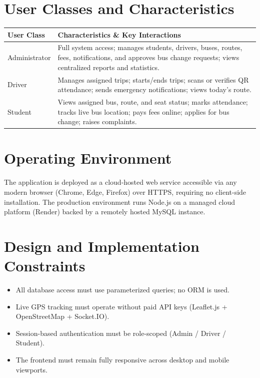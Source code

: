\documentclass[11pt,a4paper]{report}
\begin{document}
\section{User Classes and Characteristics}
\begin{longtable}{@{}p{2.6cm}p{11cm}@{}}
\toprule
\rowcolor{pine!10}\textbf{User Class} & \textbf{Characteristics \& Key Interactions} \\
\midrule
\endhead
Administrator & Full system access; manages students, drivers, buses, routes, fees, notifications, and approves bus change requests; views centralized reports and statistics. \\
Driver & Manages assigned trips; starts/ends trips; scans or verifies QR attendance; sends emergency notifications; views today's route. \\
Student & Views assigned bus, route, and seat status; marks attendance; tracks live bus location; pays fees online; applies for bus change; raises complaints. \\
\bottomrule
\end{longtable}

\section{Operating Environment}
The application is deployed as a cloud-hosted web service accessible via any modern browser (Chrome, Edge, Firefox) over HTTPS, requiring no client-side installation. The production environment runs Node.js on a managed cloud platform (Render) backed by a remotely hosted MySQL instance.

\section{Design and Implementation Constraints}
\begin{itemize}[leftmargin=1.3em]
  \item All database access must use parameterized queries; no ORM is used.
  \item Live GPS tracking must operate without paid API keys (Leaflet.js + OpenStreetMap + Socket.IO).
  \item Session-based authentication must be role-scoped (Admin / Driver / Student).
  \item The frontend must remain fully responsive across desktop and mobile viewports.
\end{itemize}

\end{document}
